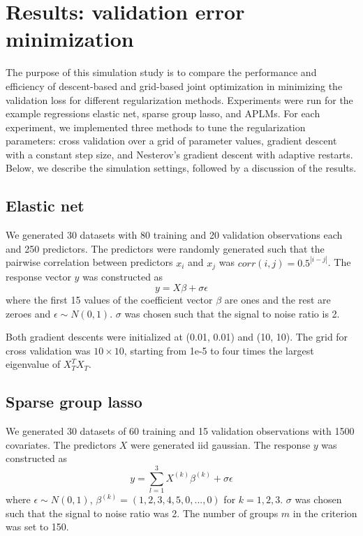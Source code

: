 \documentclass[10pt,letterpaper]{article}
\begin{document}
\section{Results: validation error minimization}

The purpose of this simulation study is to compare the performance and efficiency of descent-based and grid-based joint optimization in minimizing the validation loss for different regularization methods. Experiments were run for the example regressions elastic net, sparse group lasso, and APLMs. For each experiment, we implemented three methods to tune the regularization parameters: cross validation over a grid of parameter values, gradient descent with a constant step size, and Nesterov's gradient descent with adaptive restarts. Below, we describe the simulation settings, followed by a discussion of the results.

\subsection{Elastic net}
We generated 30 datasets with 80 training and 20 validation observations each and 250 predictors. The predictors were randomly generated such that the pairwise correlation between predictors $x_i$ and $x_j$ was $corr(i,j) = 0.5^{|i-j|}$. The response vector $y$ was constructed as
\begin{equation}
y = X\beta + \sigma \epsilon
\end{equation}
where the first 15 values of the coefficient vector $\beta$ are ones and the rest are zeroes and $\epsilon \sim N(0, 1)$. $\sigma$ was chosen such that the signal to noise ratio is 2. 

Both gradient descents were initialized at (0.01, 0.01) and (10, 10). The grid for cross validation was $10 \times 10$, starting from 1e-5 to four times the largest eigenvalue of $X_T^T X_T$.

\subsection{Sparse group lasso}

We generated 30 datasets of 60 training and 15 validation observations with 1500 covariates. The predictors $X$ were generated iid gaussian. The response $y$ was constructed as
\begin{equation}
y = \sum\limits_{l=1}^3 X^{(k)} \beta^{(k)} + \sigma \epsilon
\end{equation}
where $\epsilon \sim N(0, 1)$, $\beta^{(k)} = (1, 2, 3, 4, 5, 0, ..., 0)$ for $k = 1, 2, 3$. $\sigma$ was chosen such that the signal to noise ratio was 2. The number of groups $m$ in the criterion was set to 150.
\end{document}
